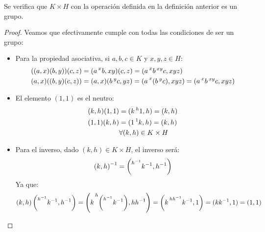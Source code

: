 \begin{prop}
    Se verifica que $K\times H$ con la operación definida en la definición anterior es un grupo.
    \begin{proof}
        Veamos que efectivamente cumple con todas las condiciones de ser un grupo:
        \begin{itemize}
            \item Para la propiedad asociativa, si $a,b,c\in K$ y $x,y,z\in H$:
                \begin{align*}
                    ((a,x)(b,y))(c,z) &= (a\prescript{x}{}{b},xy)(c,z) = (a\prescript{x}{}{b}\prescript{xy}{}{c}, xyz) \\
                    (a,x)((b,y)(c,z)) &= (a,x)(b\prescript{y}{}{c}, yz) = (a\prescript{x}{}{(b\prescript{y}{}{c})}, xyz) = (a\prescript{x}{}{b}\prescript{xy}{}{c},xyz)
                \end{align*}
            \item El elemento $(1,1)$ es el neutro:
                \begin{align*}
                    (k,h)(1,1) &= (k\prescript{h}{}{1},h) = (k,h) \\
                    (1,1)(k,h) &= (1 \prescript{1}{}{k},h) = (k,h) \\
                               &\forall (k,h)\in K\times H
                \end{align*}
            \item Para el inverso, dado $(k,h)\in K\times H$, el inverso será:
                \begin{equation*}
                    {(k,h)}^{-1} = \left(\prescript{h^{-1}}{}{k^{-1}},h^{-1}\right)
                \end{equation*}
                Ya que:
                \begin{equation*}
                    (k,h)\left(\prescript{h^{-1}}{}{k^{-1}},h^{-1}\right) = \left(k\prescript{h}{}{\left(\prescript{h^{-1}}{}{k^{-1}}\right)}, hh^{-1}\right) = \left(k\prescript{hh^{-1}}{}{k^{-1}}, 1\right) = (kk^{-1},1) = (1,1)
                \end{equation*}
        \end{itemize}
    \end{proof}
\end{prop}

